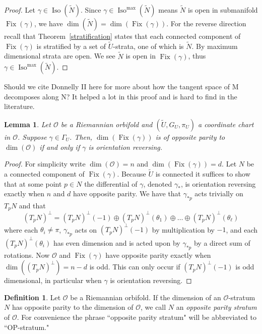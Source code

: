 \documentclass{amsart}
\theoremstyle{plain}
\newtheorem{lemma}[thm]{Lemma}
\theoremstyle{definition}
\newtheorem{definition}[thm]{Definition}
\theoremstyle{remark}
\newcommand{\wtu}{\widetilde{U}}
\newcommand{\wtn}{\widetilde{N}}
\newcommand{\orb}{\mathcal O}
\newcommand{\cc}{(\widetilde{U}, G_U, \pi_U)}
\DeclareMathOperator{\iso}{Iso}
\DeclareMathOperator{\fix}{Fix}
\begin{document}
\begin{proof}
Let $\gamma \in \iso(\wtn)$.  Since $\gamma \in \iso^{\max}(\wtn)$ means $\wtn$ is open in submanifold $\fix(\gamma)$, we have $\dim(\widetilde{N}) = \dim(\fix(\gamma))$. For the reverse direction recall that Theorem~\ref{stratification} states that each connected component of $\fix(\gamma)$ is stratified by a set of $\wtu$-strata, one of which is $\widetilde{N}$.  By \cite[Remark 2.9(i)]{dggw} maximum dimensional strata are open.  We see $\widetilde{N}$ is open in $\fix(\gamma)$, thus $\gamma \in \iso^{\max}(\wtn)$.
\end{proof}

Should we cite Donnelly II here for more about how the tangent space of M decomposes along N?  It helped a lot in this proof and is hard to find in the literature.

\begin{lemma}\label{lem:dim-of-ori-rev} Let $\orb$ be a Riemannian orbifold and $\cc$ a coordinate chart in $\orb$. Suppose $\gamma \in \Gamma_U$. Then, $\dim(\fix(\gamma))$ is of opposite parity to $\dim(\mathcal{O})$ if and only if $\gamma$ is orientation reversing. 
\end{lemma}  
\begin{proof}  For simplicity write $\dim(\orb)=n$ and $\dim(\fix(\gamma))=d$.  Let $N$ be a connected component of $\fix(\gamma)$. Because $\wtu$ is connected it suffices to show that at some point $p\in N$ the differential of $\gamma$, denoted $\gamma_*$, is orientation reversing exactly when $n$ and $d$ have opposite parity.  We have that $\gamma_{*p}$ acts trivially on $T_pN$ and that
\[(T_pN)^\perp =  (T_pN)^{\perp}(-1) \oplus  (T_pN)^{\perp}(\theta_1) \oplus \dots \oplus  (T_pN)^{\perp}(\theta_\ell)\]
where each $\theta_i \ne \pi$,  $\gamma_{*p}$ acts on $(T_pN)^{\perp}(-1)$ by multiplication by $-1$, and each $(T_pN)^{\perp}(\theta_i)$ has even dimension and is acted upon by $\gamma_{*p}$ by a direct sum of rotations.  Now $\orb$ and $\fix(\gamma)$ have opposite parity exactly when $\dim((T_pN)^\perp)=n-d$ is odd. This can only occur if $(T_pN)^{\perp}(-1)$ is odd dimensional, in particular when $\gamma$ is orientation reversing.
\end{proof}


\begin{definition} Let $\orb$ be a Riemannian orbifold. If the dimension of an $\orb$-stratum $N$ has opposite parity to the dimension of $\orb$, we call $N$ an \emph{opposite parity stratum} of $\orb$. For convenience the phrase ``opposite parity stratum" will be abbreviated to ``OP-stratum."
\end{definition}
\end{document}
